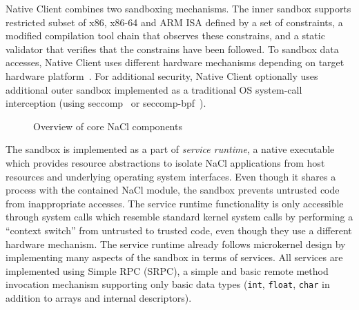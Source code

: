 
Native Client combines two sandboxing mechanisms. The inner sandbox
supports restricted subset of x86, x86-64 and ARM ISA defined by a set
of constraints, a modified compilation tool chain that observes these
constrains, and a static validator that verifies that the constrains
have been followed. To sandbox data accesses, Native Client uses
different hardware mechanisms depending on target hardware
platform~\cite{yee:ieee-sp09,sehr:usenix-sec10}. For additional
security, Native Client optionally uses additional outer sandbox
implemented as a traditional OS system-call interception (\eg using
seccomp~\cite{seccomp:linux} or
seccomp\mbox{-}bpf~\cite{seccomp-bpf:linux}).

\begin{figure}
\centering
\caption{Overview of core NaCl components}
\label{fig:architecture}
\end{figure}

The sandbox is implemented as a part of \emph{service runtime}, a native
executable which provides resource abstractions to isolate NaCl
applications from host resources and underlying operating system
interfaces. Even though it shares a process with the contained NaCl
module, the sandbox prevents untrusted code from inappropriate accesses.
The service runtime functionality is only accessible through system
calls which resemble standard kernel system calls by performing a
``context switch'' from untrusted to trusted code, even though they use
a different hardware mechanism. The service runtime already follows
microkernel design by implementing many aspects of the sandbox in terms
of services. All services are implemented using Simple RPC (SRPC), a
simple and basic remote method invocation mechanism supporting only
basic data types (\ie \lstinline`int`, \lstinline`float`,
\lstinline`char` in addition to arrays and internal descriptors).



